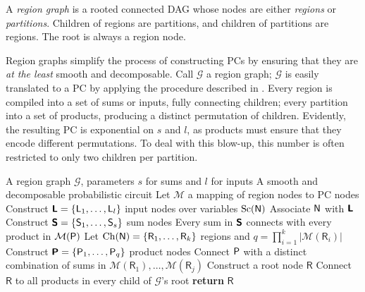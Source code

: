 \begin{definition}
  A \emph{region graph} is a rooted connected DAG whose nodes are either \emph{regions} or
  \emph{partitions}. Children of regions are partitions, and children of partitions are regions.
  The root is always a region node.
\end{definition}

Region graphs simplify the process of constructing PCs by ensuring that they are \emph{at the
least} smooth and decomposable. Call $\mathcal{G}$ a region graph; $\mathcal{G}$ is easily
translated to a PC by applying the procedure described in . Every region is
compiled into a set of sums or inputs, fully connecting children; every partition into a set of
products, producing a distinct permutation of children. Evidently, the resulting PC is exponential
on $s$ and $l$, as products must ensure that they encode different permutations. To deal with this
blow-up, this number is often restricted to only two children per partition.

\begin{algorithm}[t]
  \caption{}\label{alg:region2pc}
  \begin{algorithmic}[1]
    \Require A region graph $\mathcal{G}$, parameters $s$ for sums and $l$ for inputs
    \Ensure A smooth and decomposable probabilistic circuit
    \State Let $\mathcal{M}$ a mapping of region nodes to PC nodes
          \State Construct $\operatorname{\textsf{\textbf{L}}}=\{\operatorname{\textsf{L}}_1,\ldots,\operatorname{\textsf{L}}_l\}$ input nodes over variables $\operatorname*{\normalfont{Sc}}(\operatorname{\textsf{N}})$
          \State Associate $\operatorname{\textsf{N}}$ with $\operatorname{\textsf{\textbf{L}}}$
        \Else
          \State Construct $\operatorname{\textsf{\textbf{S}}}=\{\operatorname{\textsf{S}}_1,\ldots,\operatorname{\textsf{S}}_s\}$ sum nodes
            \State Every sum in $\operatorname{\textsf{\textbf{S}}}$ connects with every product in $\mathcal{M}(\operatorname{\textsf{P}})$
          \EndFor
        \EndIf
        \State Let $\operatorname*{\normalfont{Ch}}(\operatorname{\textsf{N}})=\{\textsf{R}_1,\ldots,\textsf{R}_k\}$ regions and $q=\prod_{i=1}^k
          |\mathcal{M}(\textsf{R}_i)|$
        \State Construct $\operatorname{\textsf{\textbf{P}}}=\{\operatorname{\textsf{P}}_1,\ldots,\operatorname{\textsf{P}}_q\}$ product nodes
          \State Connect $\operatorname{\textsf{P}}$ with a distinct combination of sums in $\mathcal{M}(\textsf{R}_1),
          \ldots,\mathcal{M}(\textsf{R}_j)$
        \EndFor
      \EndIf
    \EndFor
    \State Construct a root node $\textsf{R}$
    \State Connect $\textsf{R}$ to all products in every child of $\mathcal{G}$'s root
    \State \textbf{return} $\textsf{R}$
  \end{algorithmic}
\end{algorithm}

